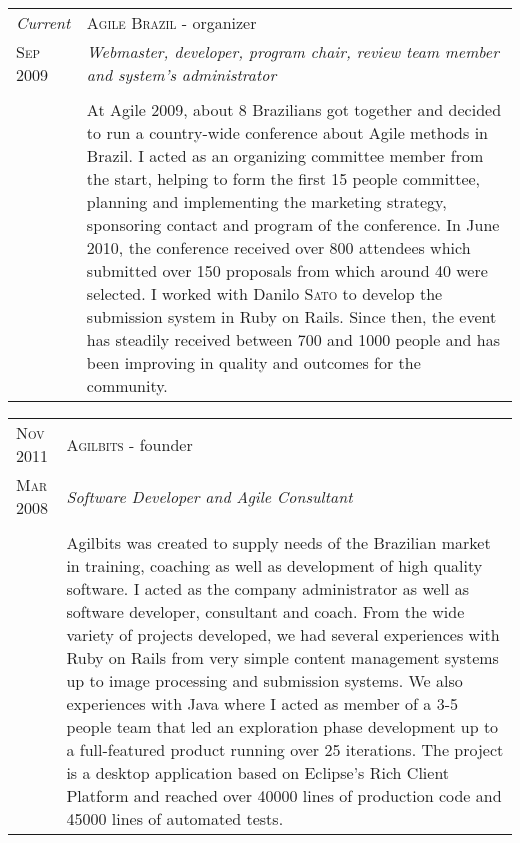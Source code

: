 \documentclass[letter,10pt]{article}
\begin{document}
\begin{tabular}{p{2.5cm}|p{13.5cm}}
  \emph{Current} & \textsc{Agile Brazil} - organizer\\
  \textsc{Sep 2009}& \emph{Webmaster, developer, program chair, review team
    member and system's administrator}\\
  &\\
  &At Agile 2009, about 8 Brazilians got together and
  decided to run a country-wide conference about Agile methods in
  Brazil. I acted as an organizing committee member from the start,
  helping to form the first 15 people committee, planning and implementing
  the marketing strategy, sponsoring contact and program of the conference.
  In June 2010, the conference received over 800 attendees which
  submitted over 150 proposals from which around 40 were selected. I
  worked with Danilo \textsc{Sato} to develop the submission system
  in Ruby on Rails. Since then, the event has steadily received between 700
  and 1000 people and has been improving in quality and outcomes for the
  community.
\end{tabular}

\begin{tabular}{p{2.5cm}|p{13.5cm}}
  \textsc{Nov 2011} & \textsc{Agilbits} - founder\\
  \textsc{Mar 2008}& \emph{Software Developer and Agile Consultant}\\
  &\\
  &Agilbits was created
  to supply needs of the Brazilian market in training, coaching as
  well as development of high quality software. I acted as the
  company administrator as well as software developer, consultant
  and coach.
  From the wide variety of projects developed, we had several
  experiences with Ruby on Rails from very simple content management
  systems up to image processing and submission systems.
  We also experiences with Java where I acted as member of a 3-5
  people team that led an exploration phase development up to a
  full-featured product running over 25 iterations. The project is a
  desktop application based on Eclipse's Rich Client Platform and
  reached over 40000 lines of production code and 45000 lines of
  automated tests.
\end{tabular}
\end{document}
